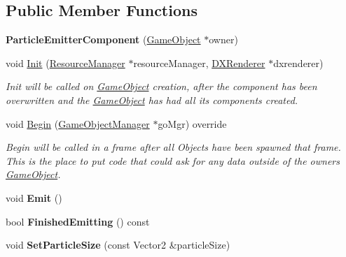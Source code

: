 \subsection*{Public Member Functions}
\begin{DoxyCompactItemize}
\item 
\mbox{\label{classParticleEmitterComponent_a86231997dc231c5575116784ea6aaaa3}} 
{\bfseries Particle\+Emitter\+Component} (\hyperlink{classGameObject}{Game\+Object} $\ast$owner)
\item 
void \hyperlink{classParticleEmitterComponent_ace8b753108a862794dacc0455707d791}{Init} (\hyperlink{classResourceManager}{Resource\+Manager} $\ast$resource\+Manager, \hyperlink{classDXRenderer}{D\+X\+Renderer} $\ast$dxrenderer)
\begin{DoxyCompactList}\small\item\em Init will be called on \hyperlink{classGameObject}{Game\+Object} creation, after the component has been overwritten and the \hyperlink{classGameObject}{Game\+Object} has had all its components created. \end{DoxyCompactList}\item 
void \hyperlink{classParticleEmitterComponent_a67e362d6c3791ded19c4011f2fe12c19}{Begin} (\hyperlink{classGameObjectManager}{Game\+Object\+Manager} $\ast$go\+Mgr) override
\begin{DoxyCompactList}\small\item\em Begin will be called in a frame after all Objects have been spawned that frame. This is the place to put code that could ask for any data outside of the owner\textquotesingle{}s \hyperlink{classGameObject}{Game\+Object}. \end{DoxyCompactList}\item 
\mbox{\label{classParticleEmitterComponent_afc4bb362afd3a8ca0617dc718290dcf8}} 
void {\bfseries Emit} ()
\item 
\mbox{\label{classParticleEmitterComponent_a4d91b32c053338e691b371aafbdd9436}} 
bool {\bfseries Finished\+Emitting} () const
\item 
\mbox{\label{classParticleEmitterComponent_aedc54d8473869460a848a1a1d29f2a35}} 
void {\bfseries Set\+Particle\+Size} (const Vector2 \&particle\+Size)
\item 

\end{DoxyCompactItemize}
